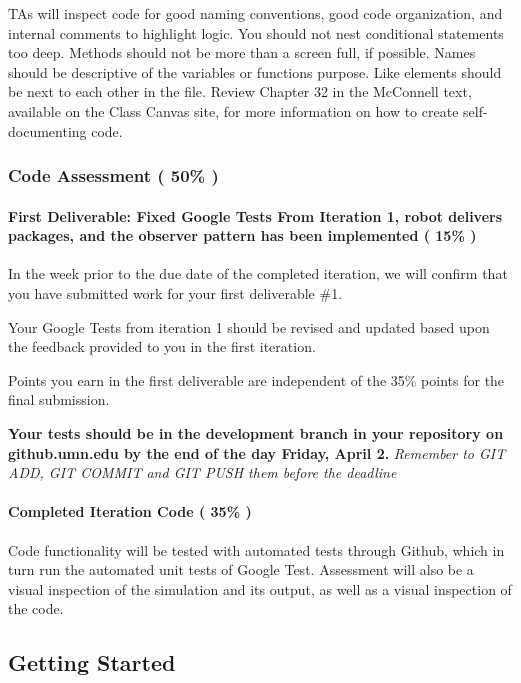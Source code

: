 T\+As will inspect code for good naming conventions, good code organization, and internal comments to highlight logic. You should not nest conditional statements too deep. Methods should not be more than a screen full, if possible. Names should be descriptive of the variable\textquotesingle{}s or function\textquotesingle{}s purpose. Like elements should be next to each other in the file. Review Chapter 32 in the Mc\+Connell text, available on the Class Canvas site, for more information on how to create self-\/documenting code.

\subsubsection*{Code Assessment ( 50\% )}

\paragraph*{First Deliverable\+: Fixed Google Tests From Iteration 1, robot delivers packages, and the observer pattern has been implemented ( 15\% )}

In the week prior to the due date of the completed iteration, we will confirm that you have submitted work for your first deliverable \#1.

Your Google Tests from iteration 1 should be revised and updated based upon the feedback provided to you in the first iteration.

Points you earn in the first deliverable are independent of the 35\% points for the final submission.

{\bfseries Your tests should be in the development branch in your repository on github.\+umn.\+edu by the end of the day Friday, April 2.} {\itshape Remember to G\+IT A\+DD, G\+IT C\+O\+M\+M\+IT and G\+IT P\+U\+SH them before the deadline}

\paragraph*{Completed Iteration Code ( 35\% )}

Code functionality will be tested with automated tests through Github, which in turn run the automated unit tests of Google Test. Assessment will also be a visual inspection of the simulation and its output, as well as a visual inspection of the code.





\subsection*{Getting Started}


